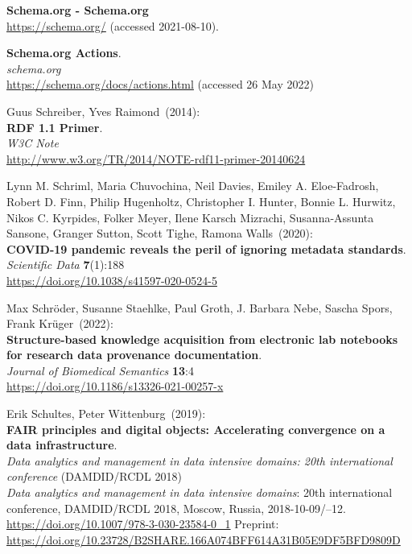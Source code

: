 \begin{thebibliography}{9}
\textbf{Schema.org - Schema.org}\\
\url{https://schema.org/} (accessed 2021-08-10).

\textbf{Schema.org {Actions}}.\\
\emph{schema.org}\\
\url{https://schema.org/docs/actions.html} (accessed 26 May 2022)

Guus Schreiber, Yves Raimond~(2014): \\
\textbf{RDF 1.1 Primer}. \\
\emph{W3C Note} \\
\url{http://www.w3.org/TR/2014/NOTE-rdf11-primer-20140624}

Lynn M. Schriml, Maria Chuvochina, Neil Davies, Emiley A. Eloe-Fadrosh, Robert D. Finn, Philip Hugenholtz, Christopher I. Hunter, Bonnie L. Hurwitz, Nikos C. Kyrpides, Folker Meyer, Ilene Karsch Mizrachi, Susanna-Assunta Sansone, Granger Sutton, Scott Tighe, Ramona Walls~(2020): \\
\textbf{COVID-19 pandemic reveals the peril of ignoring metadata standards}.\\
\emph{Scientific Data} \textbf{7}(1):188\\
\url{https://doi.org/10.1038/s41597-020-0524-5}

 Max Schröder, Susanne Staehlke, Paul Groth, J.  Barbara Nebe, Sascha Spors, Frank Krüger~(2022): \\
\textbf{Structure-based knowledge acquisition from electronic lab notebooks for research data provenance documentation}.\\
\emph{Journal of Biomedical Semantics} \textbf{13}:4\\
\url{https://doi.org/10.1186/s13326-021-00257-x}

Erik Schultes, Peter Wittenburg~(2019): \\
\textbf{FAIR principles and digital objects: Accelerating convergence on a data infrastructure}.\\
\emph{Data analytics and management in data intensive domains: 20th international conference} (DAMDID/RCDL 2018)\\
\emph{Data analytics and management in data intensive domains}: 20th international conference,
{DAMDID}/{RCDL} 2018, Moscow, Russia, 2018-10-09/--12. \\
\url{https://doi.org/10.1007/978-3-030-23584-0_1}
Preprint: \url{https://doi.org/10.23728/B2SHARE.166A074BFF614A31B05E9DF5BFD9809D}


\end{thebibliography}
